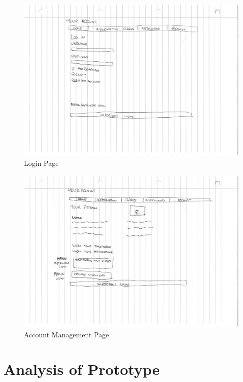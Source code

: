 \documentclass[11pt, article]{article}
\begin{document}
			\begin{figure}[ht!]
	\includegraphics[scale=0.6]{images/loginpage}
 	\caption{Login Page}
	\end{figure}

			\begin{figure}[ht!]
	\includegraphics[scale=0.6]{images/loggedinaccpage}
 	\caption{Account Management Page}
	\end{figure}


	\section{Analysis of Prototype}




\end{document}
